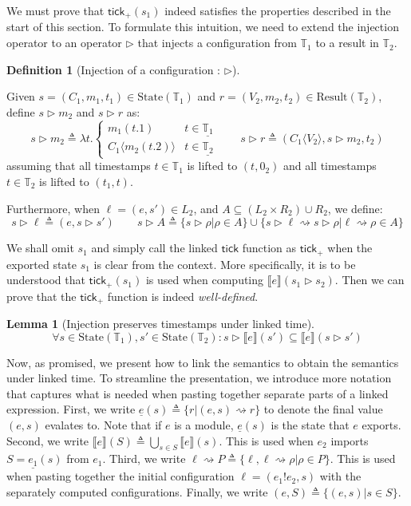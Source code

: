 \documentclass[acmsmall,review]{acmart}\settopmatter{printfolios=true,printccs=false,printacmref=false}
\theoremstyle{definition}
\newtheorem{definition}{Definition}[section]
\newtheorem{lem}{Lemma}[section]
\newcommand*{\Time}{\mathbb{T}}
\newcommand*{\mem}{m}
\newcommand*{\State}[1]{\text{State}({#1})}
\newcommand*{\Result}[1]{\text{Result}({#1})}
\newcommand*{\link}[2]{{#1}\mathtt{!}{#2}}
\newcommand*{\sembracket}[1]{\lBrack{#1}\rBrack}
\newcommand*{\tick}{\mathsf{tick}}
\newcommand*{\inject}[2]{{#1}\langle{#2}\rangle}
\begin{document}
We must prove that $\tick_+(s_1)$ indeed satisfies the properties described in the start of this section.
To formulate this intuition, we need to extend the injection operator to an operator $\rhd$ that injects a configuration from $\Time_1$ to a result in $\Time_2$.
\begin{definition}[Injection of a configuration : $\rhd$]
  $\:$

  Given ${s}=({C_1},{\mem_1},{t_1})\in\State{\Time_1}$ and ${r}=({V_2},{\mem_2},t_2)\in\Result{\Time_2}$,
  define $s\rhd m_2$ and $s\rhd r$ as:
  \[
    s\rhd m_2\triangleq
    \lambda t.
    \begin{cases}
      m_1(t.1)               & t\in\underline{\Time_1} \\
      \inject{C_1}{m_2(t.2)} & t\in\underline{\Time_2}
    \end{cases}
    \qquad
    s\rhd r\triangleq
    (\inject{C_1}{V_2},s\rhd m_2,t_2)
  \]
  assuming that all timestamps $t\in\Time_1$ is lifted to $(t,0_2)$ and all timestamps $t\in\Time_2$ is lifted to $(t_1,t)$.

  Furthermore, when $\ell=(e,s')\in L_2$, and $A\subseteq (L_2\times R_2)\cup R_2$, we define:
  \[
    s\rhd\ell\triangleq(e,s\rhd s')\qquad
    {s}\rhd{A}\triangleq\{s\rhd\rho|\rho\in A\}\cup\{s\rhd\ell\rightsquigarrow s\rhd\rho|\ell\rightsquigarrow\rho\in A\}
  \]
\end{definition}

We shall omit $s_1$ and simply call the linked $\tick$ function as $\tick_+$ when the exported state $s_1$ is clear from the context.
More specifically, it is to be understood that $\tick_+(s_1)$ is used when computing $\sembracket{e}(s_1\rhd s_2)$.
Then we can prove that the $\tick_+$ function is indeed \emph{well-defined}.

\begin{lem}[Injection preserves timestamps under linked time]
  \[
    \forall s\in\State{\Time_1},s'\in\State{\Time_2}:{s}\rhd{\sembracket{e}}({s'})\subseteq{\sembracket{e}}({s}\rhd{s'})
  \]
\end{lem}

Now, as promised, we present how to link the semantics to obtain the semantics under linked time.
To streamline the presentation, we introduce more notation that captures what is needed when pasting together separate parts of a linked expression.
First, we write $\underline{e}(s)\triangleq\{r|(e,s)\rightsquigarrow r\}$ to denote the final value $(e,s)$ evalates to.
Note that if $e$ is a module, $\underline{e}(s)$ is the state that $e$ exports.
Second, we write $\sembracket{e}(S)\triangleq\bigcup_{s\in S}\sembracket{e}(s)$.
This is used when $e_2$ imports $S=\underline{e_1}(s)$ from $e_1$.
Third, we write $\ell\rightsquigarrow P\triangleq\{\ell,\ell\rightsquigarrow\rho|\rho\in P\}$.
This is used when pasting together the initial configuration $\ell=(\link{e_1}{e_2},s)$ with the separately computed configurations.
Finally, we write $(e,S)\triangleq\{(e,s)|s\in S\}$.
\end{document}
